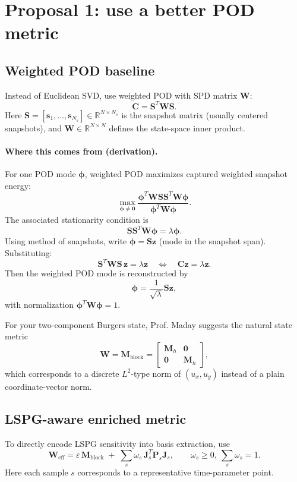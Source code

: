 \documentclass[11pt]{article}
\begin{document}
\section{Proposal 1: use a better POD metric}
\subsection{Weighted POD baseline}
Instead of Euclidean SVD, use weighted POD with SPD matrix $\mathbf W$:
\[
\mathbf C=\mathbf S^T\mathbf W\mathbf S.
\]
Here $\mathbf S=[\mathbf s_1,\dots,\mathbf s_{N_s}]\in\mathbb R^{N\times N_s}$ is the snapshot matrix (usually centered snapshots), and $\mathbf W\in\mathbb R^{N\times N}$ defines the state-space inner product.
\paragraph{Where this comes from (derivation).}
For one POD mode $\bm\phi$, weighted POD maximizes captured weighted snapshot energy:
\[
\max_{\bm\phi\neq\mathbf0}
\frac{\bm\phi^T\mathbf W\mathbf S\mathbf S^T\mathbf W\bm\phi}
{\bm\phi^T\mathbf W\bm\phi}.
\]
The associated stationarity condition is
\[
\mathbf S\mathbf S^T\mathbf W\bm\phi=\lambda\bm\phi.
\]
Using method of snapshots, write $\bm\phi=\mathbf S\mathbf z$ (mode in the snapshot span). Substituting:
\[
\mathbf S^T\mathbf W\mathbf S\,\mathbf z=\lambda\mathbf z
\quad\Longleftrightarrow\quad
\mathbf C\mathbf z=\lambda\mathbf z.
\]
Then the weighted POD mode is reconstructed by
\[
\bm\phi=\frac{1}{\sqrt{\lambda}}\mathbf S\mathbf z,
\]
with normalization $\bm\phi^T\mathbf W\bm\phi=1$.

For your two-component Burgers state, Prof. Maday suggests the natural state metric
\[
\mathbf W=\mathbf M_{\mathrm{block}}
=
\begin{bmatrix}
\mathbf M_h & \mathbf 0\\
\mathbf 0 & \mathbf M_h
\end{bmatrix},
\]
which corresponds to a discrete $L^2$-type norm of $(u_x,u_y)$ instead of a plain coordinate-vector norm.

\subsection{LSPG-aware enriched metric}
To directly encode LSPG sensitivity into basis extraction, use
\[
\mathbf W_{\mathrm{eff}}
=
\varepsilon\,\mathbf M_{\mathrm{block}}
\;+\;
\sum_s \omega_s\,\mathbf J_s^T\mathbf P_s\mathbf J_s,
\qquad
\omega_s\ge 0,\ \sum_s\omega_s=1.
\]
Here each sample $s$ corresponds to a representative time-parameter point.
\end{document}
